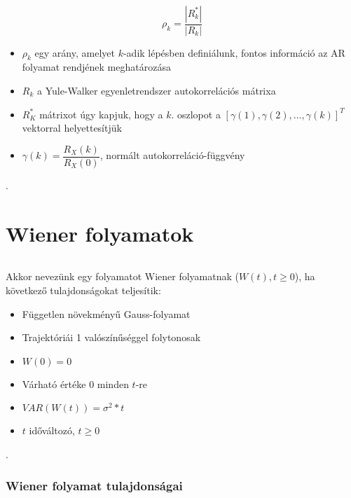 \documentclass[11pt,a4paper]{article}
\begin{document}
					\paragraph{}
						$$\rho_k = \dfrac{|R^*_k|}{|R_k|}$$
						\begin{itemize}
							\item $\rho_k$ egy arány, amelyet $k$-adik lépésben definiálunk, fontos információ az AR folyamat rendjének meghatározása
							\item $R_k$ a Yule-Walker egyenletrendszer autokorrelációs mátrixa
							\item $R^*_K$ mátrixot úgy kapjuk, hogy a $k.$ oszlopot a $[\gamma(1), \gamma(2), \dots, \gamma(k)]^T$ vektorral helyettesítjük
							\item $\gamma(k) = \dfrac{R_X(k)}{R_X(0)}$, normált autokorreláció-függvény
						\end{itemize}.
		\part{Wiener folyamatok}
			\paragraph{}
				Akkor nevezünk egy folyamatot Wiener folyamatnak ($W(t), t\ge 0$), ha következő tulajdonságokat teljesítik:
				\begin{itemize}
					\item Független növekményű Gauss-folyamat
					\item Trajektóriái 1 valószínűséggel folytonosak
					\item $W(0) = 0$
					\item Várható értéke 0 minden $t$-re
					\item $VAR(W(t)) = \sigma^2 * t$
					\item $t$ időváltozó, $t \ge 0$
				\end{itemize}.
			\section{Wiener folyamat tulajdonságai}
\end{document}
